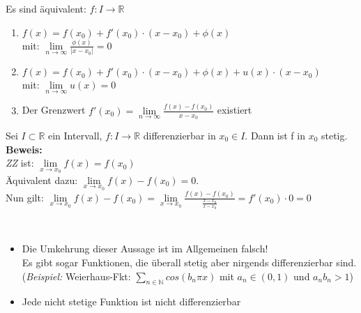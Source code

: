\setcounter{Satz}{1} 
\setcounter{Definition}{5}

\begin{Satz}{
	Es sind äquivalent: $f : I \rightarrow \mathbb{R}$
	\begin{enumerate}
		\item $f(x) = f(x_0) + f'(x_0) \cdot (x-x_0) + \phi(x) $\\
		 mit: $\lim\limits_{n \rightarrow \infty}{\frac{\phi(x)}{|x-x_0|}} = 0$
	\item $ f(x) = f(x_0) + f'(x_0) \cdot (x-x_0) + \phi(x) + u(x)  \cdot (x-x_0)$ \\
	mit: $\lim\limits_{n \rightarrow \infty}{u(x)} = 0$
	\item Der Grenzwert 
	$f'(x_0) = \lim\limits_{n \rightarrow \infty}{\frac{f(x)-f(x_0)}{x-x_0}}$ 	
	existiert
	\end{enumerate}
}\end{Satz}

\begin{Satz}{\label{satz:satz_3}
	Sei $ I \subset \mathbb{R}$ ein Intervall, $f: I \rightarrow \mathbb{R}$ 
	differenzierbar in $x_0 \in I$. Dann ist f in $x_0$ stetig. \\
	\textbf{Beweis:} \\
		\noindent\hspace*{5mm}
		\textit{ZZ}  ist: $\lim\limits_{x \rightarrow x_0}{f(x) = f(x_0)}$ \\
		\noindent\hspace*{10mm}
		Äquivalent dazu: $\lim\limits_{x \rightarrow x_0}{f(x)-f(x_0) = 0}$. \\
		\noindent\hspace*{10mm}
		Nun gilt: $\lim\limits_{x \rightarrow x_0}{f(x) - f(x_0)} = 
	 \lim\limits_{x \rightarrow x_0}{\frac{f(x)-f(x_0)}{\frac{x-x_0}{x-x_0}}}
	 = f'(x_0) \cdot 0 = 0 $
}\end{Satz}
\begin{Bemerkung}{
	\textbf{ }\\
	 \begin{itemize}
	 	\item Die Umkehrung dieser Aussage ist im Allgemeinen falsch! \\
	 	Es gibt sogar Funktionen, die überall stetig aber nirgends 
	 	differenzierbar sind. \\
	 	(\textit{Beispiel:} Weierhaus-Fkt: $\sum_{n \in \mathbb{N}} cos(b_n \pi x)$
	 	mit $a_n \in (0,1)$ und $a_n b_n >1$)
	 	\item Jede nicht stetige Funktion ist nicht differenzierbar
	 \end{itemize}	 
}\end{Bemerkung}

